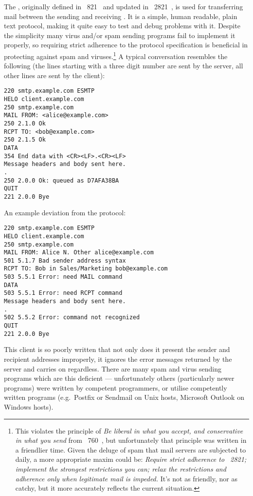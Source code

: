 \documentclass[a4paper,12pt,draft]{article}
\begin{document}
The \SMTPlong{}, originally defined in \RFC{}~821~\cite{RFC821} and updated
in \RFC{}~2821~\cite{RFC2821}, is used for transferring mail between the
sending and receiving \MTA{}\@.  It is a simple, human readable, plain text
protocol, making it quite easy to test and debug problems with it.  Despite
the simplicity many virus and/or spam sending programs fail to implement it
properly, so requiring strict adherence to the protocol specification is
beneficial in protecting against spam and viruses.\footnote{This violates
the principle of \textit{Be liberal in what you accept, and conservative in
what you send\/} from \RFC{}~760~\cite{rfc760}, but unfortunately that
principle was written in a friendlier time.  Given the deluge of spam that
mail servers are subjected to daily, a more appropriate maxim could be:
\textit{Require strict adherence to \RFC{}~2821; implement the strongest
restrictions you can; relax the restrictions and adherence only when
legitimate mail is impeded.\/}  It's not as friendly, nor as catchy, but it
more accurately reflects the current situation.} A typical \SMTP{}
conversation resembles the following (the lines starting with a three digit
number are sent by the server, all other lines are sent by the client):

\begin{verbatim}
220 smtp.example.com ESMTP
HELO client.example.com
250 smtp.example.com
MAIL FROM: <alice@example.com>
250 2.1.0 Ok
RCPT TO: <bob@example.com>
250 2.1.5 Ok
DATA
354 End data with <CR><LF>.<CR><LF>
Message headers and body sent here.
.
250 2.0.0 Ok: queued as D7AFA38BA
QUIT
221 2.0.0 Bye
\end{verbatim}

An example deviation from the protocol:

\begin{verbatim}
220 smtp.example.com ESMTP
HELO client.example.com
250 smtp.example.com
MAIL FROM: Alice N. Other alice@example.com
501 5.1.7 Bad sender address syntax
RCPT TO: Bob in Sales/Marketing bob@example.com
503 5.5.1 Error: need MAIL command
DATA
503 5.5.1 Error: need RCPT command
Message headers and body sent here.
.
502 5.5.2 Error: command not recognized
QUIT
221 2.0.0 Bye
\end{verbatim}

This client is so poorly written that not only does it present the sender
and recipient addresses improperly, it ignores the error messages returned
by the server and carries on regardless.  There are many spam and virus
sending programs which are this deficient --- unfortunately others
(particularly newer programs) were written by competent programmers, or
utilise competently written programs (e.g.\ Postfix or Sendmail on Unix
hosts, Microsoft Outlook on Windows hosts).
\end{document}
